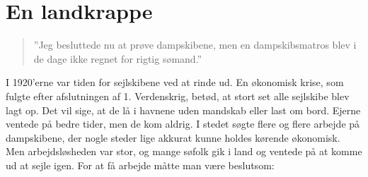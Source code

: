 \chapter{En landkrappe}\label{en-landkrappe}

\begin{quote}
''Jeg besluttede nu at prøve dampskibene, men en dampskibsmatros blev i
de dage ikke regnet for rigtig sømand.''
\end{quote}

I 1920'erne var tiden for
sejlskibene ved at rinde ud. En økonomisk krise, som fulgte efter
afslutningen af 1. Verdenskrig, betød, at stort set alle sejlskibe blev
lagt op. Det vil sige, at de lå i havnene uden mandskab eller last om
bord. Ejerne ventede på bedre tider, men de kom aldrig. I stedet søgte
flere og flere arbejde på dampskibene, der nogle steder lige akkurat
kunne holdes kørende økonomisk. Men arbejdsløsheden var stor, og mange
søfolk gik i land og ventede på at komme ud at sejle igen. For at få
arbejde måtte man være beslutsom: 

